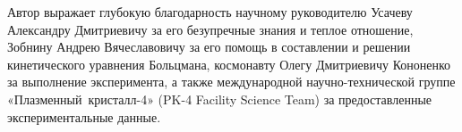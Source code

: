\Acknowledgements %
Автор выражает глубокую благодарность научному
руководителю Усачеву Александру Дмитриевичу за его безупречные знания и теплое отношение,
Зобнину Андрею Вячеславовичу за его помощь в составлении и решении
кинетического уравнения Больцмана, космонавту Олегу Дмитриевичу Кононенко за
выполнение эксперимента, а также международной научно-технической группе
«Плазменный~кристалл-4» (PK-4 Facility Science Team) за предоставленные
экспериментальные данные.